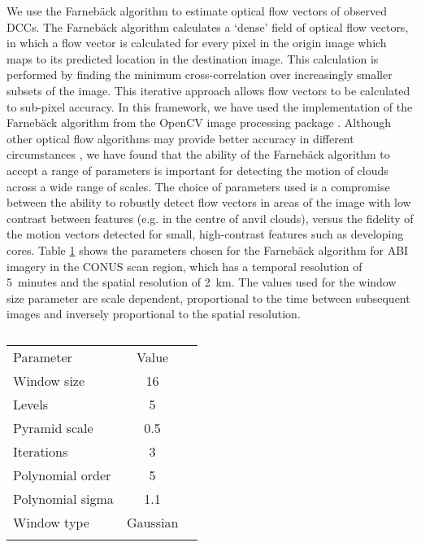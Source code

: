We use the Farnebäck algorithm \citep{farneback_two-frame_2003} to estimate optical flow vectors of observed DCCs.
The Farnebäck algorithm calculates a `dense' field of optical flow vectors, in which a flow vector is calculated for every pixel in the origin image which maps to its predicted location in the destination image.
This calculation is performed by finding the minimum cross-correlation over increasingly smaller subsets of the image.
This iterative approach allows flow vectors to be calculated to sub-pixel accuracy.
In this framework, we have used the implementation of the Farnebäck algorithm from the OpenCV image processing package \citep{opencv_library}.
Although other optical flow algorithms may provide better accuracy in different circumstances \citep{baker_database_2011}, we have found that the ability of the Farnebäck algorithm to accept a range of parameters is important for detecting the motion of clouds across a wide range of scales.
The choice of parameters used is a compromise between the ability to robustly detect flow vectors in areas of the image with low contrast between features (e.g. in the centre of anvil clouds), versus the fidelity of the motion vectors detected for small, high-contrast features such as developing cores.
Table \ref{table:parameters} shows the parameters chosen for the Farnebäck algorithm for ABI imagery in the CONUS scan region, which has a temporal resolution of 5~minutes and the spatial resolution of 2~km.
The values used for the window size parameter are scale dependent, proportional to the time between subsequent images and inversely proportional to the spatial resolution.
\begin{table}[t]
\caption{}
\label{table:parameters}
\begin{tabular}{lcr}
\tophline
Parameter        & Value    \\ 
\middlehline
Window size      & 16       \\
Levels           & 5        \\
Pyramid scale    & 0.5      \\
Iterations       & 3        \\
Polynomial order & 5        \\
Polynomial sigma & 1.1      \\
Window type      & Gaussian \\
\bottomhline
\end{tabular}
\end{table}

